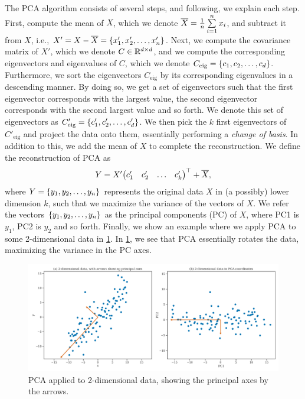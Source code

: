 The PCA algorithm consists of several steps, and following, we explain each step. First, compute the mean of $X$, which we denote $\overline{X} = \frac{1}{n} \sum\limits_{i=1}^{n} x_i$, and subtract it from $X$, i.e., $X' = X - \overline{X} = \left\{x'_1, x'_2, \ldots, x'_n\right\}$. Next, we compute the covariance matrix of $X'$, which we denote $C \in \mathbb{R}^{d \times d}$, and we compute the corresponding eigenvectors and eigenvalues of $C$, which we denote $C_\text{eig} = \left\{c_1, c_2, \ldots, c_d\right\}$. Furthermore, we sort the eigenvectors $C_\text{eig}$ by its corresponding eigenvalues in a descending manner. By doing so, we get a set of eigenvectors such that the first eigenvector corresponds with the largest value, the second eigenvector corresponds with the second largest value and so forth. We denote this set of eigenvectors as $C'_\text{eig} = \left\{c'_1, c'_2, \ldots, c'_d\right\}$. We then pick the $k$ first eigenvectors of $C'_\text{eig}$ and project the data onto them, essentially performing a \textit{change of basis}. In addition to this, we add the mean of $X$ to complete the reconstruction. We define the reconstruction of PCA as
\begin{align}
    Y = X' {\begin{pmatrix}
    c'_1 & c'_2 & \ldots & c'_k
    \end{pmatrix}}^\top + \overline{X},
    \label{eqn:pca-projection}
\end{align}
where $Y = \left\{y_1, y_2, \ldots, y_n\right\}$ represents the original data $X$ in (a possibly) lower dimension $k$, such that we maximize the variance of the vectors of $X$. We refer the vectors $\left\{y_1, y_2, \ldots, y_n\right\}$ as the principal components (PC) of $X$, where PC1 is $y_1$, PC2 is $y_2$ and so forth. Finally, we show an example where we apply PCA to some 2-dimensional data in \cref{fig:pca-2d-example}. In \cref{fig:pca-2d-example}, we see that PCA essentially rotates the data, maximizing the variance in the PC axes.
\begin{figure}[H]
    \centering
    \includegraphics[width=\textwidth]{thesis/figures/pca-2d-example.pdf}
    \caption{PCA applied to 2-dimensional data, showing the principal axes by the arrows.}
    \label{fig:pca-2d-example}
\end{figure}

